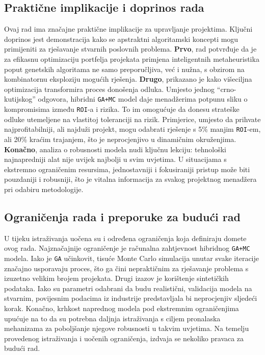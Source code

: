 \subsection{Praktične implikacije i doprinos rada}
Ovaj rad ima značajne praktične implikacije za upravljanje projektima. Ključni doprinos jest demonstracija kako se apstraktni algoritamski koncepti mogu primijeniti za rješavanje stvarnih poslovnih problema.
\textbf{Prvo}, rad potvrđuje da je za efikasnu optimizaciju portfelja projekata primjena inteligentnih metaheuristika poput genetskih algoritama ne samo preporučljiva, već i nužna, s obzirom na kombinatornu eksploziju mogućih rješenja.
\textbf{Drugo}, prikazano je kako višeciljna optimizacija transformira proces donošenja odluka. Umjesto jednog ``crno-kutijskog'' odgovora, hibridni \texttt{GA+MC} model daje menadžerima potpunu sliku o kompromisima između \texttt{ROI}-a i rizika. To im omogućuje da donesu strateške odluke utemeljene na vlastitoj toleranciji na rizik. Primjerice, umjesto da prihvate najprofitabilniji, ali najduži projekt, mogu odabrati rješenje s 5\% manjim \texttt{ROI}-em, ali 20\% kraćim trajanjem, što je neprocjenjivo u dinamičnim okruženjima.
\textbf{Konačno}, analiza o robusnosti modela nudi ključnu lekciju: tehnološki najnapredniji alat nije uvijek najbolji u svim uvjetima. U situacijama s ekstremno ograničenim resursima, jednostavniji i fokusiraniji pristup može biti pouzdaniji i robusniji, što je vitalna informacija za svakog projektnog menadžera pri odabiru metodologije.

\subsection{Ograničenja rada i preporuke za budući rad}
U tijeku istraživanja uočena su i određena ograničenja koja definiraju domete ovog rada. Najznačajnije ograničenje je računalna zahtjevnost hibridnog \texttt{GA+MC} modela. Iako je \texttt{GA} učinkovit, tisuće Monte Carlo simulacija unutar svake iteracije značajno usporavaju proces, što ga čini nepraktičnim za rješavanje problema s izuzetno velikim brojem projekata. Drugi izazov je korištenje sintetičkih podataka. Iako su parametri odabrani da budu realistični, validacija modela na stvarnim, povijesnim podacima iz industrije predstavljala bi neprocjenjiv sljedeći korak. Konačno, krhkost naprednog modela pod ekstremnim ograničenjima upućuje na to da su potrebna daljnja istraživanja s ciljem pronalaska mehanizama za poboljšanje njegove robusnosti u takvim uvjetima.
Na temelju provedenog istraživanja i uočenih ograničenja, izdvaja se nekoliko pravaca za budući rad.

